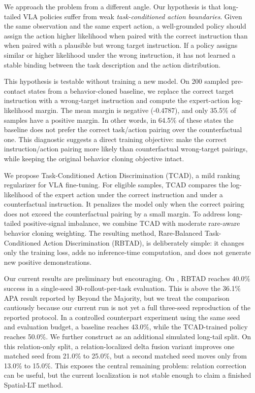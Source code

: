 We approach the problem from a different angle. Our hypothesis is that long-tailed VLA policies suffer from weak \emph{task-conditioned action boundaries}. Given the same observation and the same expert action, a well-grounded policy should assign the action higher likelihood when paired with the correct instruction than when paired with a plausible but wrong target instruction. If a policy assigns similar or higher likelihood under the wrong instruction, it has not learned a stable binding between the task description and the action distribution.

This hypothesis is testable without training a new model. On 200 sampled pre-contact states from a behavior-cloned \liberocorelt{} baseline, we replace the correct target instruction with a wrong-target instruction and compute the expert-action log-likelihood margin. The mean margin is negative (-0.4787), and only 35.5\% of samples have a positive margin. In other words, in 64.5\% of these states the baseline does not prefer the correct task/action pairing over the counterfactual one. This diagnostic suggests a direct training objective: make the correct instruction/action pairing more likely than counterfactual wrong-target pairings, while keeping the original behavior cloning objective intact.

We propose Task-Conditioned Action Discrimination (TCAD), a mild ranking regularizer for VLA fine-tuning. For eligible samples, TCAD compares the log-likelihood of the expert action under the correct instruction and under a counterfactual instruction. It penalizes the model only when the correct pairing does not exceed the counterfactual pairing by a small margin. To address long-tailed positive-signal imbalance, we combine TCAD with moderate rare-aware behavior cloning weighting. The resulting method, Rare-Balanced Task-Conditioned Action Discrimination (RBTAD), is deliberately simple: it changes only the training loss, adds no inference-time computation, and does not generate new positive demonstrations.

Our current results are preliminary but encouraging. On \liberocorelt{}, RBTAD reaches 40.0\% success in a single-seed 30-rollout-per-task evaluation. This is above the 36.1\% APA result reported by Beyond the Majority, but we treat the comparison cautiously because our current run is not yet a full three-seed reproduction of the reported protocol. In a controlled \liberocorefull{} counterpart experiment using the same seed and evaluation budget, a baseline reaches 43.0\%, while the TCAD-trained policy reaches 50.0\%. We further construct \liberospatiallt{} as an additional simulated long-tail split. On this relation-only split, a relation-localized delta fusion variant improves one matched seed from 21.0\% to 25.0\%, but a second matched seed moves only from 13.0\% to 15.0\%. This exposes the central remaining problem: relation correction can be useful, but the current localization is not stable enough to claim a finished Spatial-LT method.

